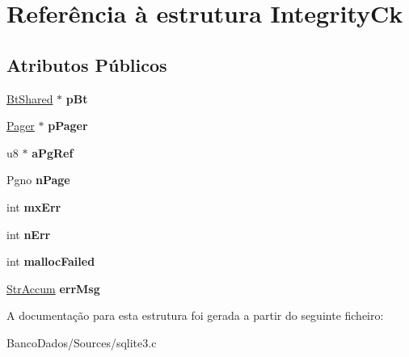 \hypertarget{struct_integrity_ck}{\section{Referência à estrutura Integrity\-Ck}
\label{struct_integrity_ck}
}
\subsection*{Atributos Públicos}
\begin{DoxyCompactItemize}
\item 
\hypertarget{struct_integrity_ck_a65f03f54514f504bd871bb2ccd3da188}{\hyperlink{struct_bt_shared}{Bt\-Shared} $\ast$ {\bfseries p\-Bt}}\label{struct_integrity_ck_a65f03f54514f504bd871bb2ccd3da188}

\item 
\hypertarget{struct_integrity_ck_a87e7f8b012b61b61fae359269cbacce4}{\hyperlink{struct_pager}{Pager} $\ast$ {\bfseries p\-Pager}}\label{struct_integrity_ck_a87e7f8b012b61b61fae359269cbacce4}

\item 
\hypertarget{struct_integrity_ck_a317f80aef5842ad69df75b55e14118d1}{u8 $\ast$ {\bfseries a\-Pg\-Ref}}\label{struct_integrity_ck_a317f80aef5842ad69df75b55e14118d1}

\item 
\hypertarget{struct_integrity_ck_a04f496ef7239aea6dccb6a861bb5a798}{Pgno {\bfseries n\-Page}}\label{struct_integrity_ck_a04f496ef7239aea6dccb6a861bb5a798}

\item 
\hypertarget{struct_integrity_ck_a9daa97cdcb1366c503451ab2af9e7ba6}{int {\bfseries mx\-Err}}\label{struct_integrity_ck_a9daa97cdcb1366c503451ab2af9e7ba6}

\item 
\hypertarget{struct_integrity_ck_a52c815a1d19be87d0ab4dc0a4e4d38e2}{int {\bfseries n\-Err}}\label{struct_integrity_ck_a52c815a1d19be87d0ab4dc0a4e4d38e2}

\item 
\hypertarget{struct_integrity_ck_a8e448c1d6483a0326a7ec39291782030}{int {\bfseries malloc\-Failed}}\label{struct_integrity_ck_a8e448c1d6483a0326a7ec39291782030}

\item 
\hypertarget{struct_integrity_ck_a1e9b79bb1d7b22a840001333200a950e}{\hyperlink{struct_str_accum}{Str\-Accum} {\bfseries err\-Msg}}\label{struct_integrity_ck_a1e9b79bb1d7b22a840001333200a950e}

\end{DoxyCompactItemize}


A documentação para esta estrutura foi gerada a partir do seguinte ficheiro\-:\begin{DoxyCompactItemize}
\item 
Banco\-Dados/\-Sources/sqlite3.\-c\end{DoxyCompactItemize}
